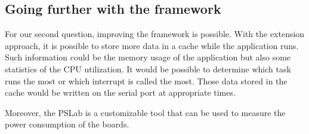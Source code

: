 \subsection*{Going further with the framework}

For our second question, improving the framework is possible.
With the extension approach, it is possible to store more data in a cache while the application runs.
Such information could be the memory usage of the application but also some statistics of the CPU utilization.
It would be possible to determine which task runs the most or which interrupt is called the most.
Those data stored in the cache would be written on the serial port at appropriate times.

Moreover, the PSLab is a customizable tool that can be used to measure the power consumption of the boards.